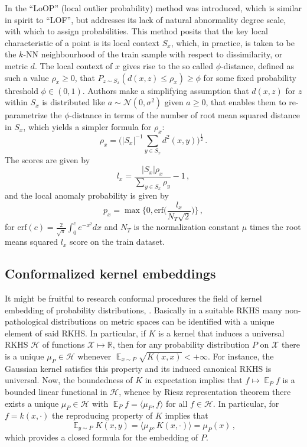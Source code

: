 \documentclass{extarticle}
\newcommand{\ex}{\mathop{\mathbb{E}}\nolimits}
\newcommand{\Hcal}{\mathcal{H}}
\newcommand{\Ncal}{\mathcal{N}}
\newcommand{\Xcal}{\mathcal{X}}
\newcommand{\Real}{\mathbb{R}}
\begin{document}
In \cite{kriegel2009} the ``LoOP'' (local outlier probability) method was introduced,
which is similar in spirit to ``LOF'', but addresses its lack of natural abnormality
degree scale, with which to assign probabilities. This method posits that the key
local characteristic of a point is its local context $S_x$, which, in practice, is
taken to be the $k$-NN neighbourhood of the train sample with respect to dissimilarity,
or metric $d$. The local context of $x$ gives rise to the so called $\phi$-distance,
defined as such a value $\rho_x\geq 0$, that $P_{z\sim S_x}(d(x,z)\leq \rho_x)\geq \phi$
for some fixed probability threshold $\phi\in(0,1)$. Authors make a simplifying assumption
that $d(x,z)$ for $z$ within $S_x$ is distributed like $a\sim \Ncal(0, \sigma^2)$
given $a\geq0$, that enables them to re-parametrize the $\phi$-distance in terms of
the number of root mean squared distance in $S_x$, which yields a simpler formula
for $\rho_x$:
\begin{equation*}
    \rho_x
    = \bigl(|S_x|^{-1} \sum_{y \in S_x} d^2(x, y)\bigr)^\frac{1}{2}
    \,.
\end{equation*}
The scores are given by 
$$ l_x = \frac{|S_x|\rho_x}{\sum_{y\in S_x} \rho_y}-1\,, $$
and the local anomaly probability is given by
$$ p_x = \max\bigl\{0, \text{erf}\bigl(\frac{l_x}{N_T\sqrt{2}}\bigr)\Bigr\}\,, $$
for $\text{erf}(c) = \frac{2}{\sqrt{\pi}} \int_0^c e^{-x^2} dx$ and $N_T$ is the
normalization constant $\mu$ times the root means squared $l_x$ score on the train
dataset.

\subsection{Conformalized kernel embeddings} %
\label{sub:conformalized_kernel_embeddings}

It might be fruitful to research conformal procedures the field of kernel embedding
of probability distributions, \cite{smola2007}. Basically in a suitable RKHS many non-
pathological distributions on metric spaces can be identified with a unique element
of said RKHS. In particular, if $K$ is a kernel that induces a universal RKHS $\Hcal$
of functions $\Xcal\mapsto\Real$, then for any probability distribution $P$ on $\Xcal$
there is a unique $\mu_P\in \Hcal$ whenever $\ex_{x\sim P} \sqrt{K(x,x)} < +\infty$.
For instance, the Gaussian kernel satisfies this property and its induced canonical
RKHS is universal. Now, the boundedness of $K$ in expectation implies that $f\mapsto \ex_P f$
is a bounded linear functional in $\Hcal$, whence by Riesz representation theorem there
exists a unique $\mu_P\in \Hcal$ with $\ex_P f = \langle \mu_P, f\rangle$ for all
$f\in \Hcal$. In particular, for $f = k(x, \cdot)$ the reproducing property of $K$
implies that
\begin{equation*}
  \ex_{y\sim P} K(x, y) = \langle \mu_P, K(x, \cdot) \rangle = \mu_P(x) \,,
\end{equation*}
which provides a closed formula for the embedding of $P$.
\end{document}
